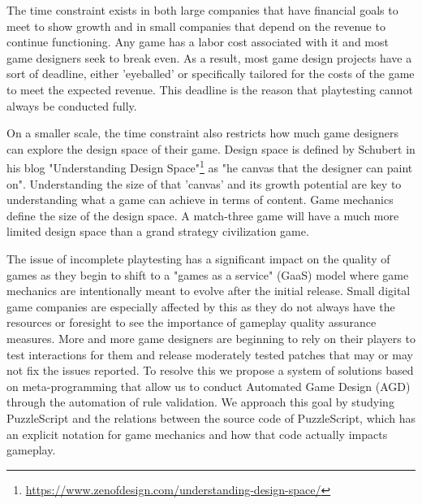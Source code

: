 
The time constraint exists in both large companies that have financial goals to meet to show growth and in small companies that depend on the revenue to continue functioning. Any game has a labor cost associated with it and most game designers seek to break even. As a result, most game design projects have a sort of deadline, either 'eyeballed' or specifically tailored for the costs of the game to meet the expected revenue. This deadline is the reason that playtesting cannot always be conducted fully.  

On a smaller scale, the time constraint also restricts how much game designers can explore the design space of their game. Design space is defined by Schubert in his blog "Understanding Design Space"\footnote{\url{https://www.zenofdesign.com/understanding-design-space/}} as "he canvas that the designer can paint on". Understanding the size of that 'canvas' and its growth potential are key to understanding what a game can achieve in terms of content. Game mechanics define the size of the design space. A match-three game will have a much more limited design space than a grand strategy civilization game.

The issue of incomplete playtesting has a significant impact on the quality of games as they begin to shift to a "games as a service" (GaaS) model where game mechanics are intentionally meant to evolve after the initial release. Small digital game companies are especially affected by this as they do not always have the resources or foresight to see the importance of gameplay quality assurance measures\cite{10.1145/2994310.2994364}. More and more game designers are beginning to rely on their players to test interactions for them and release moderately tested patches that may or may not fix the issues reported\cite{Brühlmann_Schmid_Mekler_2016}. To resolve this we propose a system of solutions based on meta-programming that allow us to conduct Automated Game Design (AGD) through the automation of rule validation. We approach this goal by studying PuzzleScript and the relations between the source code of PuzzleScript, which has an explicit notation for game mechanics and how that code actually impacts gameplay.





